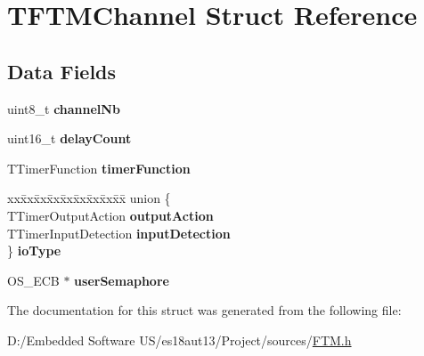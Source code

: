 \hypertarget{struct_t_f_t_m_channel}{}\section{T\+F\+T\+M\+Channel Struct Reference}
\label{struct_t_f_t_m_channel}
\subsection*{Data Fields}
\begin{DoxyCompactItemize}
\item 
\hypertarget{struct_t_f_t_m_channel_aa2404895d5318fcd6aecab3147c14826}{}uint8\+\_\+t {\bfseries channel\+Nb}\label{struct_t_f_t_m_channel_aa2404895d5318fcd6aecab3147c14826}

\item 
\hypertarget{struct_t_f_t_m_channel_abb555760e71da6a4822a1ace343381f2}{}uint16\+\_\+t {\bfseries delay\+Count}\label{struct_t_f_t_m_channel_abb555760e71da6a4822a1ace343381f2}

\item 
\hypertarget{struct_t_f_t_m_channel_aa5f3d62a353d779117ced0877fa47734}{}T\+Timer\+Function {\bfseries timer\+Function}\label{struct_t_f_t_m_channel_aa5f3d62a353d779117ced0877fa47734}

\item 
\hypertarget{struct_t_f_t_m_channel_ad8efee18dddc770115cb5f65be6e0ac6}{}\begin{tabbing}
xx\=xx\=xx\=xx\=xx\=xx\=xx\=xx\=xx\=\kill
union \{\\
\>TTimerOutputAction {\bfseries outputAction}\\
\>TTimerInputDetection {\bfseries inputDetection}\\
\} {\bfseries ioType}\label{struct_t_f_t_m_channel_ad8efee18dddc770115cb5f65be6e0ac6}
\\

\end{tabbing}\item 
\hypertarget{struct_t_f_t_m_channel_aad0abd327f44f55579052e206e0fe3b0}{}O\+S\+\_\+\+E\+C\+B $\ast$ {\bfseries user\+Semaphore}\label{struct_t_f_t_m_channel_aad0abd327f44f55579052e206e0fe3b0}

\end{DoxyCompactItemize}


The documentation for this struct was generated from the following file\+:\begin{DoxyCompactItemize}
\item 
D\+:/\+Embedded Software U\+S/es18aut13/\+Project/sources/\hyperlink{_f_t_m_8h}{F\+T\+M.\+h}\end{DoxyCompactItemize}
